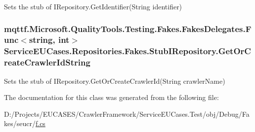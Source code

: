 Sets the stub of I\-Repository.\-Get\-Identifier(\-String identifier)

\hypertarget{class_service_e_u_cases_1_1_repositories_1_1_fakes_1_1_stub_i_repository_a3077b6eea8e44618b8d9e12ec9b881dc}{
\subsubsection[{Get\-Or\-Create\-Crawler\-Id\-String}]{\setlength{\rightskip}{0pt plus 5cm}mqttf.\-Microsoft.\-Quality\-Tools.\-Testing.\-Fakes.\-Fakes\-Delegates.\-Func$<$string, int$>$ Service\-E\-U\-Cases.\-Repositories.\-Fakes.\-Stub\-I\-Repository.\-Get\-Or\-Create\-Crawler\-Id\-String}}\label{class_service_e_u_cases_1_1_repositories_1_1_fakes_1_1_stub_i_repository_a3077b6eea8e44618b8d9e12ec9b881dc}


Sets the stub of I\-Repository.\-Get\-Or\-Create\-Crawler\-Id(\-String crawler\-Name)



The documentation for this class was generated from the following file\-:\begin{DoxyCompactItemize}
\item 
D\-:/\-Projects/\-E\-U\-C\-A\-S\-E\-S/\-Crawler\-Framework/\-Service\-E\-U\-Cases.\-Test/obj/\-Debug/\-Fakes/seucr/\hyperlink{seucr_2f_8cs}{f.\-cs}\end{DoxyCompactItemize}
